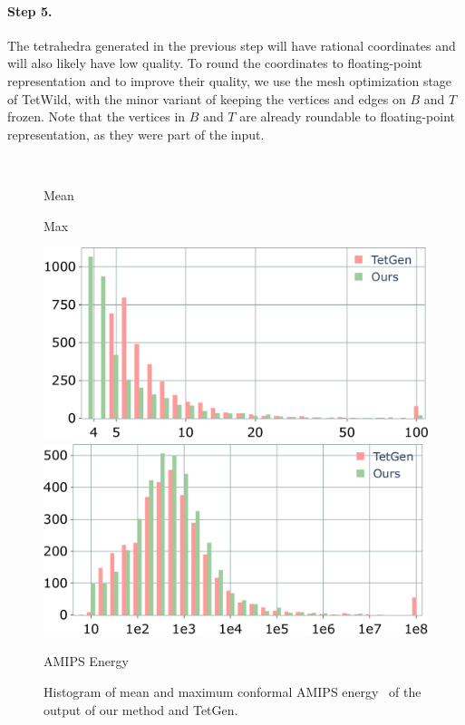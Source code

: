 \paragraph{Step 5.}
The tetrahedra generated in the previous step will have rational coordinates and will also likely have low quality. To round the coordinates to floating-point representation and to improve their quality, we use the mesh optimization stage of TetWild, with the minor variant of keeping the vertices and edges on $B$ and $T$ frozen. Note that the vertices in $B$ and $T$ are already roundable to floating-point representation, as they were part of the input.


\begin{figure}
    \centering
    \parbox{0.02\linewidth}{~}\hfill\hfill
    \parbox{.47\linewidth}{\centering Mean}\hfill
    \parbox{.47\linewidth}{\centering Max}\par
    \parbox{0.02\linewidth}{\centering{}}\hfill\hfill
    \parbox{.47\linewidth}{\includegraphics[width=\linewidth]{curve_meshing_in_shell_tex/figs/stats/tetgen_meanE}}\hfill
    \parbox{.47\linewidth}{\includegraphics[width=\linewidth]{curve_meshing_in_shell_tex/figs/stats/tetgen_maxE}}\par
     \scriptsize{AMIPS Energy}
    \caption{Histogram of mean and maximum conformal AMIPS energy~\cite{rabinovich2017scalable} of the output of our method and TetGen.}
    \label{bichon:fig:energy-max-avg}
\end{figure}

